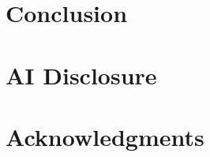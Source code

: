 \documentclass[11pt]{article}
\begin{document}
\section{Conclusion}
\label{sec:conclusion}

\section*{AI Disclosure}

\section*{Acknowledgments}


\end{document}
